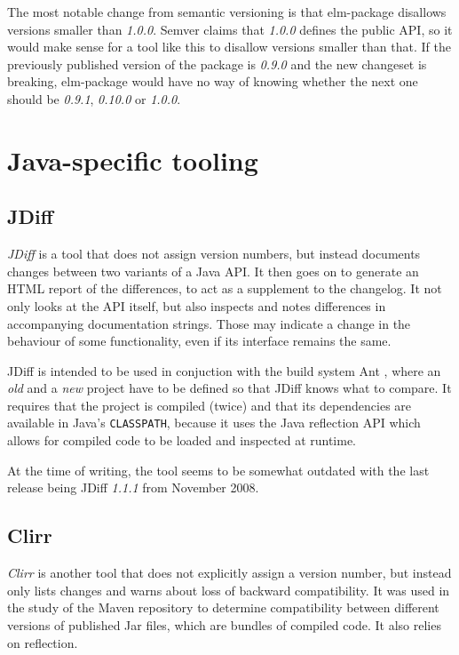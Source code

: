 \documentclass{l4proj}
\newcommand\genericstyle{\lstset{basicstyle=\ttm}}
\newcommand\codeinline[1]{{\genericstyle\lstinline!#1!}}
\begin{document}
The most notable change from semantic versioning is that elm-package
disallows versions smaller than \textit{1.0.0}. Semver claims that \textit{1.0.0}
defines the public API, so it would make sense for a tool like this to
disallow versions smaller than that. If the previously published
version of the package is \textit{0.9.0} and the new changeset is breaking,
elm-package would have no way of knowing whether the next one should
be \textit{0.9.1}, \textit{0.10.0} or \textit{1.0.0}.

\section{Java-specific tooling}

\subsection{JDiff}

\textit{JDiff} \cite{JDiff} is a tool that does not assign version
numbers, but instead documents changes between two variants of a Java API.
It then goes on to generate an HTML report of the differences, to act
as a supplement to the changelog. It not only looks at the API itself,
but also inspects and notes differences in accompanying documentation
strings. Those may indicate a change in the behaviour of some functionality,
even if its interface remains the same.

JDiff is intended to be used in conjuction with the build system Ant
\cite{Ant}, where an \textit{old} and a \textit{new} project have to
be defined so that JDiff knows what to compare. It requires that the
project is compiled (twice) and that its dependencies are available in
Java's \codeinline{CLASSPATH}, because it uses the Java reflection API
which allows for compiled code to be loaded and inspected at runtime.

At the time of writing, the tool seems to be somewhat outdated with
the last release being JDiff \textit{1.1.1} from November 2008.

\subsection{Clirr}

\textit{Clirr} \cite{Clirr} is another tool that does not explicitly
assign a version number, but instead only lists changes and warns
about loss of backward compatibility. It was used in the study of the
Maven repository \cite{SemverMaven} to determine compatibility between
different versions of published Jar files, which are bundles of
compiled code. It also relies on reflection.
\end{document}
